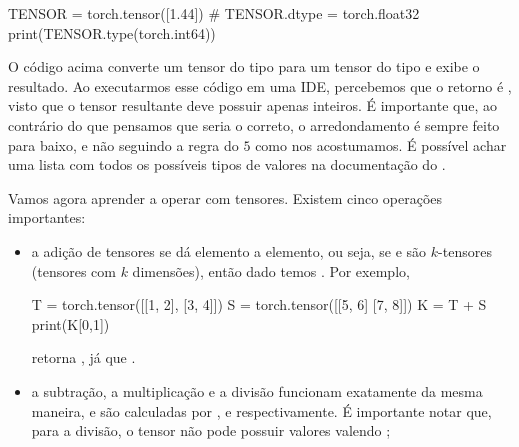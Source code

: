 \documentclass{article}
\begin{document}
\begin{python}
TENSOR = torch.tensor([1.44]) # TENSOR.dtype = torch.float32
print(TENSOR.type(torch.int64))
\end{python}

O código acima converte um tensor do tipo  para um tensor do tipo  e exibe o resultado. Ao executarmos esse código em uma IDE, percebemos que o retorno é , visto que o tensor resultante deve possuir apenas inteiros. É importante que, ao contrário do que pensamos que seria o correto, o arredondamento é sempre feito para baixo, e não seguindo a regra do $5$ como nos acostumamos. É possível achar uma lista com todos os possíveis tipos de valores na documentação do .

Vamos agora aprender a operar com tensores. Existem cinco operações importantes: \begin{itemize}
    \item a adição de tensores se dá elemento a elemento, ou seja, se  e  são $k$-tensores (tensores com $k$ dimensões), então dado  temos . Por exemplo, \begin{python}
T = torch.tensor([[1, 2],
                  [3, 4]])
S = torch.tensor([[5, 6]
                  [7, 8]])
K = T + S
print(K[0,1])
    \end{python} retorna , já que .

    \item a subtração, a multiplicação e a divisão funcionam exatamente da mesma maneira, e são calculadas por ,  e  respectivamente. É importante notar que, para a divisão, o tensor  não pode possuir valores valendo ;
\end{itemize}
\end{document}
